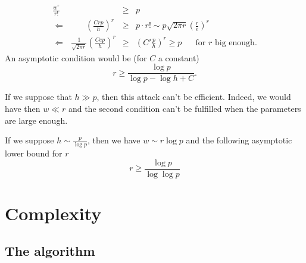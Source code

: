 \documentclass[a4paper]{article}
\begin{document}
\begin{eqnarray*}
\frac{w^r}{r!} &\geq& p \\
\Leftarrow \ \ \ \ \ \ \ \ \ \ \ \left(\frac{Crp}{h}\right)^r  &\geq& p \cdot r! \sim p \sqrt{2\pi r} \left(\frac{r}{e}\right)^r \\
\Leftarrow \ \ \ \frac{1}{\sqrt{2\pi r}} \left(\frac{Cep}{h}\right)^r &\geq& \left(C'\frac{p}{h}\right)^r \geq p \ \ \ \ \ \ \text{ for $r$ big enough.}
\end{eqnarray*}
An asymptotic condition would be (for $C$ a constant)
$$ r \geq \frac{\log p}{\log p - \log h + C} .$$

If we suppose that $h \gg p$, then this attack can't be efficient. Indeed, we would have then $w \ll r$ and the second condition can't be fulfilled when the parameters are large enough.

If we suppose $h \sim \frac{p}{\log p}$, then we have $w \sim r \log p$ and the following asymptotic lower bound for $r$
$$ r \geq \frac{\log p}{\log \log p}$$



\section{Complexity}

\subsection{The algorithm}
\end{document}
